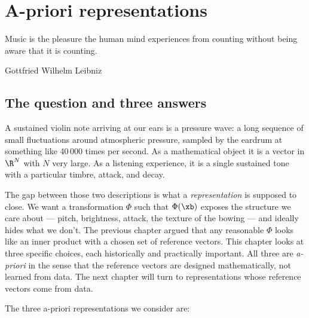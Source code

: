 %

\chapter{A-priori representations}

\epigraph{Music is the pleasure the human mind experiences from counting
without being aware that it is counting.}{Gottfried Wilhelm Leibniz}

\section{The question and three answers}

\noindent A sustained violin note arriving at our ears is a pressure
wave: a long sequence of small fluctuations around atmospheric pressure,
sampled by the eardrum at something like 40\,000 times per second.  As a
mathematical object it is a vector in $\R^N$ with $N$ very large.  As a
listening experience, it is a single sustained tone with a particular
timbre, attack, and decay.

The gap between those two descriptions is what a \emph{representation} is
supposed to close.  We want a transformation $\Phi$ such that $\Phi(\xb)$
exposes the structure we care about --- pitch, brightness, attack, the
texture of the bowing --- and ideally hides what we don't.  The previous
chapter argued that any reasonable $\Phi$ looks like an inner product
with a chosen set of reference vectors.  This chapter looks at three
specific choices, each historically and practically important.  All
three are \emph{a-priori} in the sense that the reference vectors are
designed mathematically, not learned from data.  The next chapter will
turn to representations whose reference vectors come from data.

The three a-priori representations we consider are:

